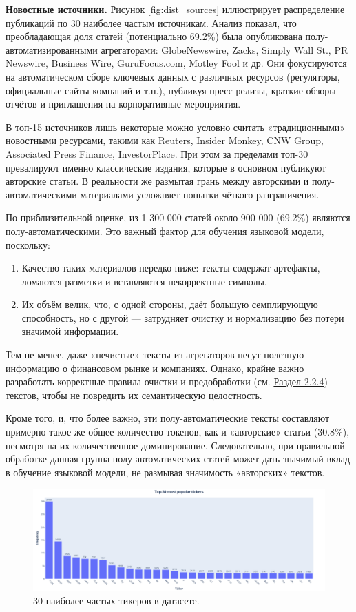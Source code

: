 \textbf{Новостные источники.} Рисунок \ref{fig:dist_sources} иллюстрирует распределение публикаций по 30 наиболее частым источникам.
Анализ показал, что преобладающая доля статей (потенциально 69.2\%) была опубликована полу-автоматизированными агрегаторами:
GlobeNewswire, Zacks, Simply Wall St., PR Newswire, Business Wire, GuruFocus.com, Motley Fool и др. Они фокусируются
на автоматическом сборе ключевых данных с различных ресурсов (регуляторы, официальные сайты компаний и т.п.), публикуя
пресс-релизы, краткие обзоры отчётов и приглашения на корпоративные мероприятия.

В топ-15 источников лишь некоторые можно условно считать «традиционными» новостными ресурсами, такими как Reuters,
Insider Monkey, CNW Group, Associated Press Finance, InvestorPlace. При этом за пределами топ-30 превалируют именно
классические издания, которые в основном публикуют авторские статьи. В реальности же размытая грань между авторскими
и полу-автоматическими материалами усложняет попытки чёткого разграничения.

По приблизительной оценке, из 1 300 000 статей около 900 000 (69.2\%) являются полу-автоматическими.
Это важный фактор для обучения языковой модели, поскольку:

\begin{enumerate}
    \item Качество таких материалов нередко ниже: тексты содержат артефакты, ломаются разметки и вставляются некорректные символы.
    \item Их объём велик, что, с одной стороны, даёт большую семплирующую способность, но с другой — затрудняет очистку и нормализацию без потери значимой информации.
\end{enumerate}

Тем не менее, даже «нечистые» тексты из агрегаторов несут полезную информацию о финансовом рынке и компаниях. Однако, крайне важно разработать корректные правила
очистки и предобработки (см. \hyperref[sec:data_prep]{Раздел 2.2.4}) текстов, чтобы не повредить их семантическую целостность.

Кроме того, и, что более важно, эти полу-автоматические тексты составляют примерно такое же общее количество токенов,
как и «авторские» статьи (30.8\%), несмотря на их количественное доминирование. Следовательно, при правильной обработке
данная группа полу-автоматических статей может дать значимый вклад в обучение языковой модели, не размывая значимость
«авторских» текстов.

\begin{figure}[H]
    \centering
    \includegraphics[width=1\linewidth]{img/top30_tickers.png}
    \caption{\label{fig:dist_tickers}30 наиболее частых тикеров в датасете.}
\end{figure}

